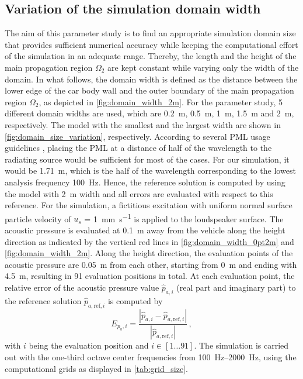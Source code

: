 {\subsection*{Variation of the simulation domain width}
The aim of this parameter study is to find an appropriate simulation domain size that provides sufficient numerical accuracy while keeping the computational effort of the simulation in an adequate range. 
Thereby, the length and the height of the main propagation region $\Omega_2$ are kept constant while varying only the width of the domain. 
In what follows, the domain width is defined as the distance between the lower edge of the car body wall and the outer boundary of the main propagation region $\Omega_2$, as depicted in \cref{fig:domain_width_2m}. For the parameter study, 5 different domain widths are used, which are \SI{0.2}{\meter}, \SI{0.5}{\meter}, \SI{1}{\meter}, \SI{1.5}{\meter} and \SI{2}{\meter}, respectively. The model with the smallest and the largest width are shown in \cref{fig:domain_size_variation}, respectively. 
According to several PML usage guidelines \cite{PML_3ds, PML_comsol, PML_quickwave}, placing the PML at a distance of half of the wavelength to the radiating source would be sufficient for most of the cases. 
For our simulation, it would be \SI{1.71}{\meter}, which is the half of the wavelength corresponding to the lowest analysis frequency \SI{100}{\hertz}.
Hence, the reference solution is computed by using the model with \SI{2}{\meter} width and all errors are evaluated with respect to this reference. For the simulation, a fictitious excitation with uniform normal surface particle velocity of $u_s$ = \SI{1}{\milli\meter\per\second} is applied to the loudspeaker surface. 
The acoustic pressure is evaluated at \SI{0.1}{\meter} away from the vehicle along the height direction as indicated by the vertical red lines in \cref{fig:domain_width_0pt2m} and \cref{fig:domain_width_2m}. Along the height direction, the evaluation points of the acoustic pressure are \SI{0.05}{\meter} from each other, starting from \SI{0}{\meter} and ending with \SI{4.5}{\meter}, resulting in 91 evaluation positions in total. At each evaluation point, the relative error of the acoustic pressure value $\hat{p}_{a,i}$ (real part and imaginary part) to the reference solution $\hat{p}_{a,\text{ref},i}$ is computed by
\begin{equation}
	E_{p_a,i} = \frac{\left| \hat{p}_{a,i} - \hat{p}_{a,\text{ref},i} \right|}{\left|\hat{p}_{a,\text{ref},i}\right|}\,,
\end{equation}
with $i$ being the evaluation position and $i \in \left[1\dots91\right]$. The simulation is carried out with the one-third octave center frequencies from \SIrange{100}{2000}{\hertz}, using the computational grids as displayed in \cref{tab:grid_size}.

}
